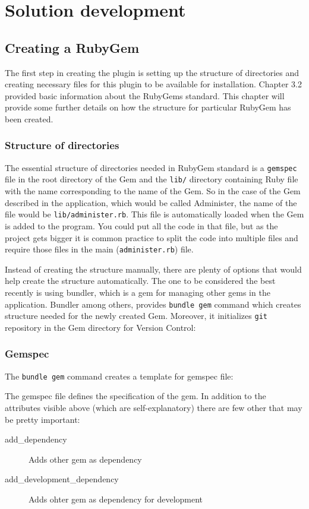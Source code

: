 
\chapter{Solution development}
  \section{Creating a RubyGem}
    The first step in creating the plugin is setting up the structure of directories and creating necessary
    files for this plugin to be available for installation. Chapter 3.2 provided basic information about 
    the RubyGems standard. This chapter will provide some further details on how the structure for particular
    RubyGem has been created.
    
    \subsection{Structure of directories}
      The essential structure of directories needed in RubyGem standard is a \texttt{gemspec} file in the 
      root directory of the Gem and the \texttt{lib/} directory containing Ruby file with the name 
      corresponding to the name of the Gem. So in the case of the Gem described in the application,
      which would be called Administer, the name of the file would be \texttt{lib/administer.rb}. This 
      file is automatically loaded when the Gem is added to the program. You could put all the code 
      in that file, but as the project gets bigger it is common practice to split the code into multiple 
      files and require those files in the main (\texttt{administer.rb}) file.
      
      Instead of creating the structure manually, there are plenty of options that would help create
      the structure automatically. The one to be considered the best recently is using bundler, which is
      a gem for managing other gems in the application. Bundler among others, provides \texttt{bundle gem}
      command which creates structure needed for the newly created Gem. Moreover, it initializes \texttt{git}
      repository in the Gem directory for Version Control:
      
      
      
    \subsection{Gemspec}
      The \texttt{bundle gem} command creates a template for gemspec file:
      
      
      
      The gemspec file defines the specification of the gem. In addition to the attributes visible
      above (which are self-explanatory) there are few other that may be pretty important:
      \begin{description} 
        \item[add\_dependency] Adds other gem as dependency
        \item[add\_development\_dependency] Adds ohter gem as dependency for development
      \end{description}
    